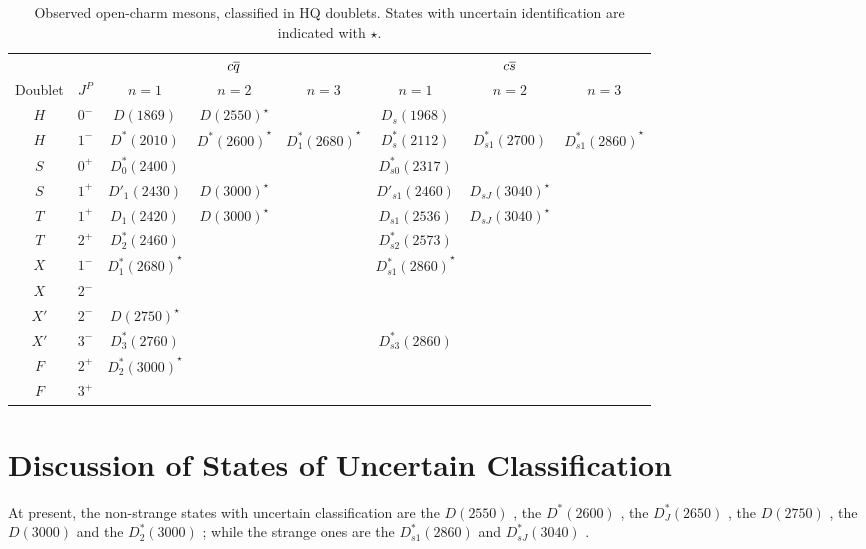 \begin{table}
  \centering
  \footnotesize
  \begin{tabular}{c c c c c c c c}
    \toprule
    & & \multicolumn{3}{c}{$c \overline{q}$} & \multicolumn{3}{c}{$c \overline{s}$} \\
    Doublet & $J^P$ & $n = 1$ & $n = 2$ & $n = 3$ & $n = 1$ & $n = 2$ & $n = 3$ \\
    \midrule
    $H$ & $0^-$ & $D(1869)$ & $\left. D(2550) \right.^\star$ & & $D_s(1968)$ & & \\ 
    $H$ & $1^-$ & $D^*(2010)$ & $\left. D^* (2600) \right.^\star$ & $\left. D^*_1(2680) \right.^\star$ & $D_s^*(2112)$ & $D_{s1}^*(2700)$ & $\left. D^*_{s 1}(2860) \right.^\star$ \\
    \addlinespace
    $S$ & $0^+$ & $D^*_0(2400)$ & & & $D_{s0}^*(2317)$ & & \\
    $S$ & $1^+$ & $D'_1(2430)$ & $\left. D(3000) \right.^\star$ & & $D'_{s1}(2460)$ & $\left. D_{sJ}(3040) \right.^\star$ & \\
    \addlinespace
    $T$ & $1^+$ & $D_1(2420)$ & $\left. D(3000) \right.^\star$ & & $D_{s1}(2536)$ & $\left. D_{sJ}(3040) \right.^\star$ & \\
    $T$ & $2^+$ & $D^*_2(2460)$ & & & $D_{s2}^*(2573)$ & & \\
    \addlinespace
    $X$ & $1^-$ & $\left. D^*_1(2680) \right.^\star$ & & & $\left. D^*_{s 1}(2860) \right.^\star$ & & \\
    $X$ & $2^-$ & & & & & & \\
    \addlinespace
    $X'$ & $2^-$ & $\left. D(2750) \right.^\star$ & & & & & \\
    $X'$ & $3^-$ & $D^*_3(2760)$ & & & $D^*_{s 3}(2860)$ & & \\
    \addlinespace
    $F$ & $2^+$ & $\left. D^*_2(3000) \right.^\star$ & & & & & \\
    $F$ & $3^+$ & & & & & & \\
    \bottomrule
  \end{tabular}
  \caption{Observed open-charm mesons, classified in HQ doublets. States with uncertain identification are indicated with $\star$.}
  \label{tab:charm_taxonomy}
\end{table}

\section{Discussion of States of Uncertain Classification}

At present, the non-strange states with uncertain classification are the $D(2550)$ \cite{delAmoSanchez:2010vq,Aaij:2013sza}, the $D^*(2600)$ \cite{delAmoSanchez:2010vq}, the $D^*_J(2650)$ \cite{Aaij:2013sza,Aaij:2016fma}, the $D(2750)$ \cite{delAmoSanchez:2010vq}, the $D(3000)$ \cite{Aaij:2013sza} and the $D^*_2(3000)$ \cite{Aaij:2013sza,Aaij:2016fma}; while the strange ones are the $D^*_{s 1}(2860)$ \cite{Aaij:2014xza} and $D^*_{s J}(3040)$ \cite{Aubert:2009wg}.

